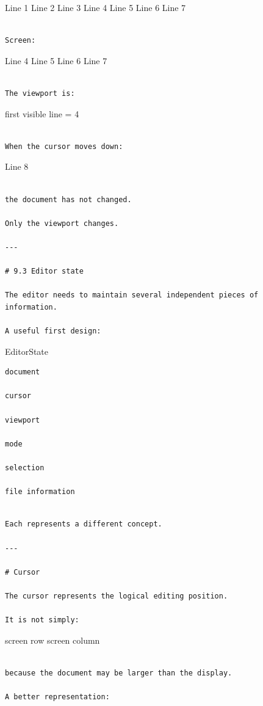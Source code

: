 \documentclass[
  oneside,
  openany]{book}
\begin{document}
Line 1 Line 2 Line 3 Line 4 Line 5 Line 6 Line 7

\begin{verbatim}

Screen:
\end{verbatim}

Line 4 Line 5 Line 6 Line 7

\begin{verbatim}

The viewport is:
\end{verbatim}

first visible line = 4

\begin{verbatim}

When the cursor moves down:
\end{verbatim}

Line 8

\begin{verbatim}

the document has not changed.

Only the viewport changes.

---

# 9.3 Editor state

The editor needs to maintain several independent pieces of information.

A useful first design:
\end{verbatim}

EditorState

\begin{verbatim}
document

cursor

viewport

mode

selection

file information
\end{verbatim}

\begin{verbatim}

Each represents a different concept.

---

# Cursor

The cursor represents the logical editing position.

It is not simply:
\end{verbatim}

screen row screen column

\begin{verbatim}

because the document may be larger than the display.

A better representation:
\end{verbatim}
\end{document}
